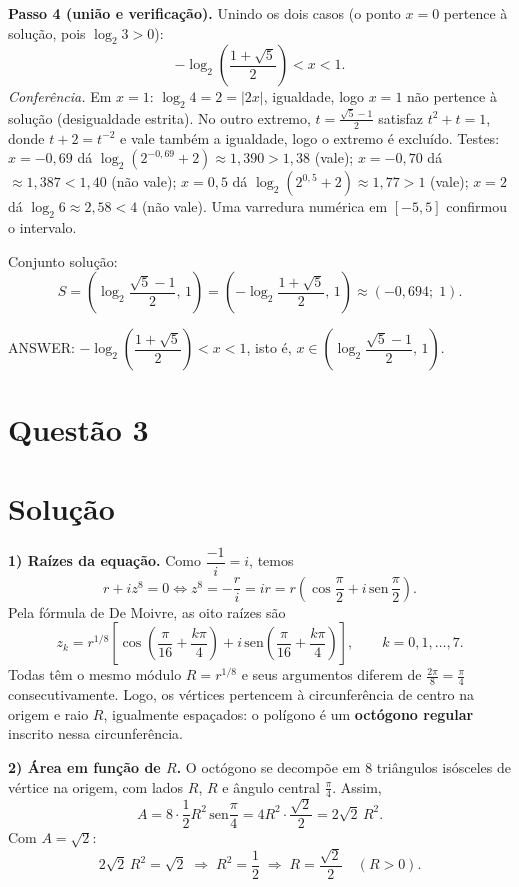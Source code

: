 \documentclass{article}%
\begin{document}
\textbf{Passo 4 (união e verificação).} Unindo os dois casos (o ponto $x=0$ pertence à solução, pois $\log_2 3>0$):
\[
-\log_2\!\left(\frac{1+\sqrt5}{2}\right)<x<1 .
\]
\emph{Conferência.} Em $x=1$: $\log_2 4=2=|2x|$, igualdade, logo $x=1$ não pertence à solução (desigualdade estrita). No outro extremo, $t=\frac{\sqrt5-1}{2}$ satisfaz $t^2+t=1$, donde $t+2=t^{-2}$ e vale também a igualdade, logo o extremo é excluído. Testes: $x=-0{,}69$ dá $\log_2(2^{-0,69}+2)\approx1{,}390>1{,}38$ (vale); $x=-0{,}70$ dá $\approx1{,}387<1{,}40$ (não vale); $x=0{,}5$ dá $\log_2(2^{0,5}+2)\approx1{,}77>1$ (vale); $x=2$ dá $\log_2 6\approx2{,}58<4$ (não vale). Uma varredura numérica em $[-5,5]$ confirmou o intervalo.

Conjunto solução:
\[
S=\left(\log_2\frac{\sqrt5-1}{2},\,1\right)=\left(-\log_2\frac{1+\sqrt5}{2},\,1\right)\approx(-0{,}694;\;1).
\]

ANSWER: $-\log_2\!\left(\dfrac{1+\sqrt5}{2}\right)<x<1$, isto é, $x\in\left(\log_2\dfrac{\sqrt5-1}{2},\,1\right)$.%
\newpage%
\section*{Questão 3}

\section*{Solução}

\textbf{1) Raízes da equação.} Como $\dfrac{-1}{i}=i$, temos
\[
r+iz^8=0 \iff z^8=-\frac{r}{i}=ir=r\left(\cos\frac{\pi}{2}+i\,\mathrm{sen}\,\frac{\pi}{2}\right).
\]
Pela fórmula de De Moivre, as oito raízes são
\[
z_k=r^{1/8}\left[\cos\!\left(\frac{\pi}{16}+\frac{k\pi}{4}\right)+i\,\mathrm{sen}\!\left(\frac{\pi}{16}+\frac{k\pi}{4}\right)\right],\qquad k=0,1,\dots,7 .
\]
Todas têm o mesmo módulo $R=r^{1/8}$ e seus argumentos diferem de $\frac{2\pi}{8}=\frac{\pi}{4}$ consecutivamente. Logo, os vértices pertencem à circunferência de centro na origem e raio $R$, igualmente espaçados: o polígono é um \textbf{octógono regular} inscrito nessa circunferência.

\textbf{2) Área em função de $R$.} O octógono se decompõe em $8$ triângulos isósceles de vértice na origem, com lados $R$, $R$ e ângulo central $\frac{\pi}{4}$. Assim,
\[
A=8\cdot\frac12 R^2\,\mathrm{sen}\frac{\pi}{4}=4R^2\cdot\frac{\sqrt2}{2}=2\sqrt2\,R^2 .
\]
Com $A=\sqrt2$:
\[
2\sqrt2\,R^2=\sqrt2 \;\Longrightarrow\; R^2=\frac12 \;\Longrightarrow\; R=\frac{\sqrt2}{2}\quad(R>0).
\]
\end{document}
